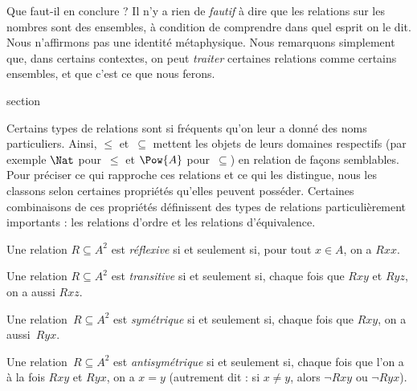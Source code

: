 \documentclass[11pt,a4paper,openany]{memoir}
\begin{document}
Que faut-il en conclure ?
Il n'y a rien de \emph{fautif} à dire que les relations sur
les nombres sont des ensembles, à condition de comprendre
dans quel esprit on le dit. Nous n'affirmons pas une identité
métaphysique. Nous remarquons simplement que, dans certains
contextes, on peut \emph{traiter} certaines relations comme
certains ensembles, et que c'est ce que nous ferons.


\endgroup



\begingroup
\expandafter\def\csname ol@sectioncs\endcsname{section}
\def\olfilename{special-properties}



\begin{intro}
Certains types de relations sont si fréquents qu’on leur a donné des noms
particuliers. Ainsi, $\le$ et~$\subseteq$ mettent les objets de leurs domaines
respectifs (par exemple $\Nat$ pour~$\le$ et $\Pow{A}$ pour~$\subseteq$)
en relation de façons semblables. Pour préciser ce qui rapproche ces
relations et ce qui les distingue, nous les classons selon certaines
propriétés qu’elles peuvent posséder. Certaines combinaisons de ces
propriétés définissent des types de relations particulièrement importants :
les relations d’ordre et les relations d’équivalence.
\end{intro}

\begin{defn}[Réflexivité]
Une relation $R \subseteq A^2$ est \emph{réflexive} si et seulement si,
pour tout $x \in A$, on a $Rxx$.
\end{defn}

\begin{defn}[Transitivité]
Une relation $R \subseteq A^2$ est \emph{transitive} si et seulement si,
chaque fois que $Rxy$ et $Ryz$, on a aussi $Rxz$.
\end{defn}

\begin{defn}[Symétrie]
Une relation~$R \subseteq A^2$ est \emph{symétrique} si et seulement si,
chaque fois que $Rxy$, on a aussi~$Ryx$.
\end{defn}

\begin{defn}[Antisymétrie]
Une relation~$R \subseteq A^2$ est \emph{antisymétrique} si et seulement si,
chaque fois que l’on a à la fois $Rxy$ et $Ryx$, on a $x=y$
(autrement dit : si $x\neq y$, alors $\lnot Rxy$ ou $\lnot Ryx$).
\end{defn}
\end{document}
